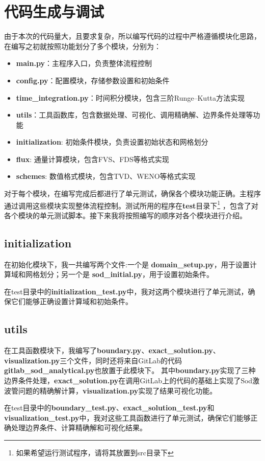 \documentclass[UTF8]{ctexart}
\begin{document}
\newpage
\section{代码生成与调试}
由于本次的代码量大，且要求复杂，所以编写代码的过程中严格遵循模块化思路，在编写之初就按照功能划分了多个模块，分别为：
\begin{itemize}
    \item \textbf{main.py}：主程序入口，负责整体流程控制
    \item \textbf{config.py}：配置模块，存储参数设置和初始条件
    \item \textbf{time\_integration.py}：时间积分模块，包含三阶Runge--Kutta方法实现
    \item \textbf{utils}：工具函数库，包含数据处理、可视化、调用精确解、边界条件处理等功能
    \item \textbf{initialization}: 初始条件模块，负责设置初始状态和网格划分
    \item \textbf{flux}: 通量计算模块，包含FVS、FDS等格式实现
    \item \textbf{schemes}: 数值格式模块，包含TVD、WENO等格式实现
\end{itemize}
对于每个模块，在编写完成后都进行了单元测试，确保各个模块功能正确。主程序通过调用这些模块实现整体流程控制。测试所用的程序在\textbf{test}目录下\footnote{如果希望运行测试程序，请将其放置到src目录下}
，包含了对各个模块的单元测试脚本。接下来我将按照编写的顺序对各个模块进行介绍。
\subsection{initialization}
在初始化模块下，我一共编写两个文件:一个是 \textbf{domain\_setup.py}，用于设置计算域和网格划分；另一个是 \textbf{sod\_initial.py}，用于设置初始条件。

在test目录中的\textbf{initialization\_test.py}中，我对这两个模块进行了单元测试，确保它们能够正确设置计算域和初始条件。
\subsection{utils}
在工具函数模块下，我编写了\textbf{boundary.py}、\textbf{exact\_solution.py}、\textbf{visualization.py}三个文件，同时还将来自GitLab\cite{sodcal2025}的代码\textbf{gitlab\_sod\_analytical.py}也放置于此模块下。
其中\textbf{boundary.py}实现了三种边界条件处理，\textbf{exact\_solution.py}在调用GitLab上的代码的基础上实现了Sod激波管问题的精确解计算，\textbf{visualization.py}实现了结果可视化功能。

在test目录中的\textbf{boundary\_test.py}、\textbf{exact\_solution\_test.py}和\textbf{visualization\_test.py}中，我对这些工具函数进行了单元测试，确保它们能够正确处理边界条件、计算精确解和可视化结果。
\end{document}
